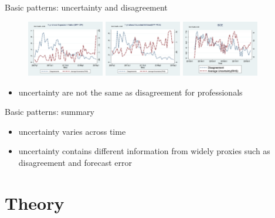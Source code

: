 \documentclass{beamer}
\begin{document}
\begin{frame}{Basic patterns: uncertainty and disagreement}
	\begin{figure}
		\centering
		\label{DisgVar}
		\includegraphics[width=0.3\textwidth]{figuresDraft/CPI_disg_varSPFCPIQ.png}
		\includegraphics[width=0.3\textwidth]{figuresDraft/PCE_disg_varSPFPCEQ.png}
		\includegraphics[width=0.3\textwidth]{figuresDraft/Q9_disg_varSCEM.png}
	\end{figure}
\begin{itemize}
	\item uncertainty are not the same as disagreement for professionals 
\end{itemize}
\end{frame}

\begin{frame}{Basic patterns: summary}
	\begin{itemize}
		\item uncertainty varies across time 
		\item uncertainty contains different information from widely  proxies such as disagreement and forecast error
	\end{itemize}
\end{frame}

\section{Theory}
\end{document}

